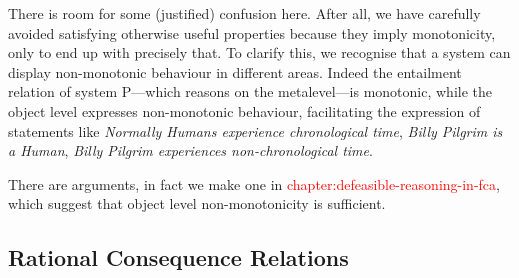 There is room for some (justified) confusion here. After all, we have carefully avoided satisfying otherwise useful properties
because they imply monotonicity, only to end up with precisely that. To clarify this, we recognise that a system can
display non-monotonic behaviour in different areas. Indeed the entailment relation of system P---which reasons on the metalevel---is
monotonic, while the object level expresses non-monotonic behaviour, facilitating the expression of statements like \textit{Normally
Humans experience chronological time}, \textit{Billy Pilgrim is a Human}, \textit{Billy Pilgrim experiences non-chronological
time}.

There are arguments, in fact we make one in \textcolor{red}{chapter:defeasible-reasoning-in-fca}, which suggest that object
level non-monotonicity is sufficient.





\subsection{Rational Consequence Relations}
\label{subsection:rational-consequence-relations}

